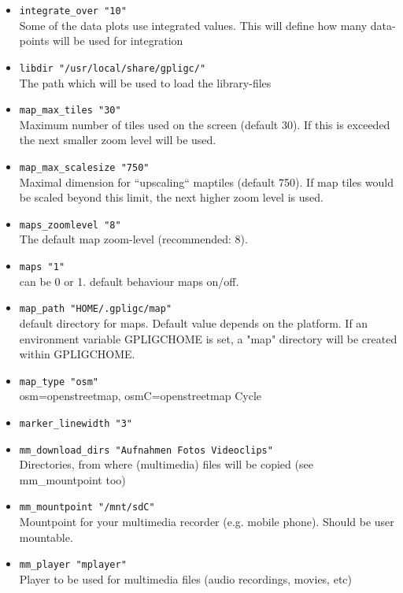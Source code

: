\begin{itemize}
\item \texttt{integrate\_over    "10"}\\
    Some of the data plots use integrated values. This will define how many data-points will
    be used for  integration
\item \texttt{libdir    "/usr/local/share/gpligc/"}\\
    The path which will be used to load the library-files

\item \texttt{map\_max\_tiles "30"}\\ Maximum number of tiles used on the screen (default 30). If this is exceeded the next smaller zoom level will be used.
\item \texttt{map\_max\_scalesize "750"}\\ Maximal dimension for ``upscaling`` maptiles (default 750).
If map tiles would be scaled beyond this limit, the next higher zoom level is used.
\item \texttt{maps\_zoomlevel "8"}\\ The default map zoom-level (recommended: 8).
\item \texttt{maps "1"}\\ can be 0 or 1. default behaviour maps on/off.
\item \texttt{map\_path "HOME/.gpligc/map"}\\
default directory for maps. Default value depends on the platform.
If an environment variable GPLIGCHOME is set, a "map" directory will be created within GPLIGCHOME.

\item \texttt{map\_type "osm"}\\  osm=openstreetmap, osmC=openstreetmap Cycle

\item \texttt{marker\_linewidth    "3"}
\item \texttt{mm\_download\_dirs    "Aufnahmen Fotos Videoclips"}\\
	Directories, from where (multimedia) files will be copied (see mm\_mountpoint too)
\item \texttt{mm\_mountpoint    "/mnt/sdC"} \\
	Mountpoint for your multimedia recorder (e.g. mobile phone). Should be user mountable.
\item \texttt{mm\_player    "mplayer"} \\
	Player to be used for multimedia files (audio recordings, movies, etc)


\end{itemize}
